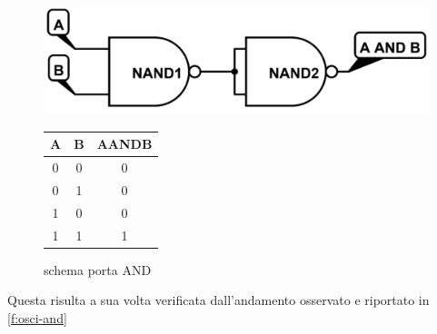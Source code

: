 \begin{figure}[H]
	\begin{minipage}{0.5\textwidth}
		\centering
		\includegraphics[scale=0.22]{../Figs-Tabs/AND_.png}
		\caption{schema porta AND}
		\label{f:AND}
	\end{minipage}
	\begin{minipage}{0.5\textwidth}
		\centering
		\begin{tabular}{ccc}
			\toprule
			A & B & A\;AND\;B	\\
			\midrule
			0  & 0 & 0\\
			0  & 1 & 0\\
			1  & 0 & 0\\
			1  & 1 & 1\\
			\bottomrule
		\end{tabular}
		\label{t:AND}
	\end{minipage}
\end{figure}

Questa risulta a sua volta verificata dall'andamento osservato e riportato in \figurename{ \ref{f:osci-and}}

